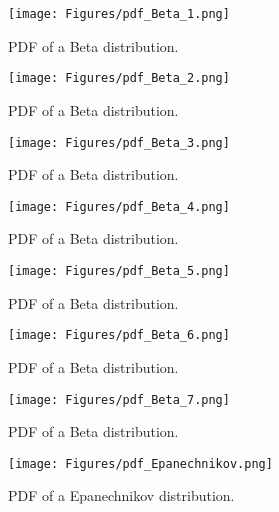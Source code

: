 {\begin{itemize}
\begin{figure}[H]
\begin{minipage}{8cm}
\begin{center}
\texttt{[image: Figures/pdf\_Beta\_1.png]}
\caption{PDF of a Beta distribution.}
\end{center}
\end{minipage}
\hfill
\begin{minipage}{8cm}
\begin{center}
\texttt{[image: Figures/pdf\_Beta\_2.png]}
\caption{PDF of a Beta distribution.}
\end{center}
\end{minipage}
\end{figure}

\begin{figure}[H]
\begin{minipage}{8cm}
\begin{center}
\texttt{[image: Figures/pdf\_Beta\_3.png]}
\caption{PDF of a Beta distribution.}
\end{center}
\end{minipage}
\hfill
\begin{minipage}{8cm}
\begin{center}
\texttt{[image: Figures/pdf\_Beta\_4.png]}
\caption{PDF of a Beta distribution.}
\end{center}
\end{minipage}
\end{figure}


\begin{figure}[H]
\begin{minipage}{8cm}
\begin{center}
\texttt{[image: Figures/pdf\_Beta\_5.png]}
\caption{PDF of a Beta distribution.}
\end{center}
\end{minipage}
\hfill
\begin{minipage}{8cm}
\begin{center}
\texttt{[image: Figures/pdf\_Beta\_6.png]}
\caption{PDF of a Beta distribution.}
\end{center}
\end{minipage}
\end{figure}



\begin{figure}[H]
\begin{minipage}{8cm}
\begin{center}
\texttt{[image: Figures/pdf\_Beta\_7.png]}
\caption{PDF of a Beta distribution.}
\end{center}
\end{minipage}
\hfill
\begin{minipage}{8cm}
\begin{center}
\texttt{[image: Figures/pdf\_Epanechnikov.png]}
\caption{PDF of a Epanechnikov distribution.}
\label{EpanechnikovPDF}
\end{center}
\end{minipage}
\end{figure}



\end{itemize}}

